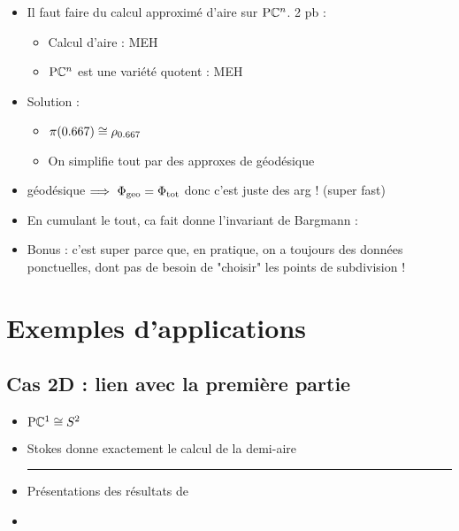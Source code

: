 \begin{itemize}
	
	\item Il faut faire du calcul approximé d'aire sur $\text{\normalfont P}\mathbb{C}^{n}$. 2 pb : \begin{itemize}
		
		\item Calcul d'aire : MEH
		
		\item  $\text{\normalfont P}\mathbb{C}^{n}$ est une variété quotent : MEH
		
	\end{itemize}
	
	\item Solution : \begin{itemize}
		
		\item $\pi(\x) \cong \rho_{\x}$
		
		\item On simplifie tout par des approxes de géodésique
	\end{itemize}
	
	\item géodésique $\Longrightarrow\ \Phi_{\text{\normalfont geo}} = \Phi_{\text{\normalfont tot}}$ donc c'est juste des arg ! (super fast)
	
	\item En cumulant le tout, ca fait donne l'invariant de Bargmann :
	
	\item Bonus : c'est super parce que, en pratique, on a toujours des données ponctuelles, dont pas de besoin de "choisir" les points de subdivision !
\end{itemize}




\section{\todo Exemples d'applications} \label{sec:exemples_appli}

\subsection{\todo Cas 2D : lien avec la première partie} \label{subsec:ex-2D}

\begin{itemize}
	
	\item $\text{\normalfont P}\mathbb{C}^{1} \cong S^2$
	
	\item Stokes donne exactement le calcul de la demi-aire \\
	
	\hrule
	
	\item Présentations des résultats de \cite{le_bihan_modephysiques_2023}
	
	\item {}
	
\end{itemize}



